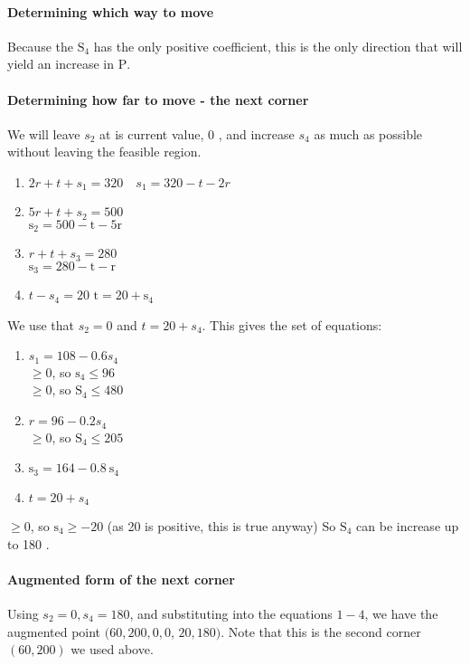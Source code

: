 \paragraph{Determining which way to move}
Because the $\mathrm{S}_{4}$ has the only positive coefficient, this is the only direction that will yield an increase in $\mathrm{P}$.

\paragraph{Determining how far to move - the next corner}
We will leave $s_{2}$ at is current value, 0 , and increase $s_{4}$ as much as possible without leaving the feasible region.

\begin{enumerate}
  \item $2 r+t+s_{1}=320 \quad s_{1}=320-t-2 r$
  \item $5 r+t+s_{2}=500$\\
$\mathrm{s}_{2}=500-\mathrm{t}-5 \mathrm{r}$
  \item $r+t+s_{3}=280$\\
$\mathrm{s}_{3}=280-\mathrm{t}-\mathrm{r}$
  \item $t-s_{4}=20$ $\mathrm{t}=20+\mathrm{s}_{4}$
\end{enumerate}
We use that $s_{2}=0$ and $t=20+s_{4}$. This gives the set of equations:

\begin{enumerate}
  \item $s_{1}=108-0.6 s_{4}$\\
$\geq 0$, so $\mathrm{s}_{4} \leq 96$\\
$\geq 0$, so $\mathrm{S}_{4} \leq 480$

  \item $r=96-0.2 s_{4}$\\
$\geq 0$, so $\mathrm{S}_{4} \leq 205$

  \item $\mathrm{s}_{3}=164-0.8 \mathrm{~s}_{4}$

  \item $t=20+s_{4}$

\end{enumerate}
$\geq 0$, so $\mathrm{s}_{4} \geq-20$ (as 20 is positive, this is true anyway) So $\mathrm{S}_{4}$ can be increase up to 180 .

\paragraph{Augmented form of the next corner}
Using $s_{2}=0, s_{4}=180$, and substituting into the equations $1-4$, we have the augmented point $(60,200,0,0$, $20,180)$. Note that this is the second corner $(60,200)$ we used above.

